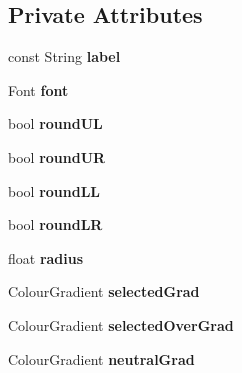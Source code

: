 \subsection*{Private Attributes}
\begin{DoxyCompactItemize}
\item 
\hypertarget{classUtilityButton_aa546e57b46b8421960a2f44356519374}{const String {\bfseries label}}\label{classUtilityButton_aa546e57b46b8421960a2f44356519374}

\item 
\hypertarget{classUtilityButton_a167cd427e65ee235d7cd7cbf1c5bd0b1}{Font {\bfseries font}}\label{classUtilityButton_a167cd427e65ee235d7cd7cbf1c5bd0b1}

\item 
\hypertarget{classUtilityButton_a5764d2ecaf8d351ddfec645cc5c8c9b8}{bool {\bfseries round\-U\-L}}\label{classUtilityButton_a5764d2ecaf8d351ddfec645cc5c8c9b8}

\item 
\hypertarget{classUtilityButton_a28ac7cdc8989d02ed9de37fee2a69d60}{bool {\bfseries round\-U\-R}}\label{classUtilityButton_a28ac7cdc8989d02ed9de37fee2a69d60}

\item 
\hypertarget{classUtilityButton_abe36ec1a745ae8038577a93b83cc64a8}{bool {\bfseries round\-L\-L}}\label{classUtilityButton_abe36ec1a745ae8038577a93b83cc64a8}

\item 
\hypertarget{classUtilityButton_ae164d537e1a9de5b4876aea19091468f}{bool {\bfseries round\-L\-R}}\label{classUtilityButton_ae164d537e1a9de5b4876aea19091468f}

\item 
\hypertarget{classUtilityButton_ab077438a18aee979e440f8e240cf7ec7}{float {\bfseries radius}}\label{classUtilityButton_ab077438a18aee979e440f8e240cf7ec7}

\item 
\hypertarget{classUtilityButton_a69b52bad0ed0e10436b850db09822d5f}{Colour\-Gradient {\bfseries selected\-Grad}}\label{classUtilityButton_a69b52bad0ed0e10436b850db09822d5f}

\item 
\hypertarget{classUtilityButton_a1a8c608e3e9accf5ffbc66ad182d61e3}{Colour\-Gradient {\bfseries selected\-Over\-Grad}}\label{classUtilityButton_a1a8c608e3e9accf5ffbc66ad182d61e3}

\item 
\hypertarget{classUtilityButton_a18ca4f6648554c0f744f09ee78365843}{Colour\-Gradient {\bfseries neutral\-Grad}}\label{classUtilityButton_a18ca4f6648554c0f744f09ee78365843}


\end{DoxyCompactItemize}
